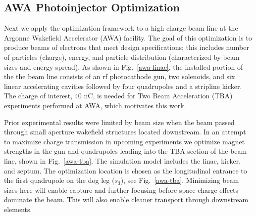 \subsection{AWA Photoinjector Optimization} \label{awaproblem}
Next we apply the optimization framework to a high charge beam line
 at the Argonne Wakefield Accelerator (AWA) facility. 
The goal of this optimization is to produce beams of electrons that meet 
design specifications; this includes number of particles (charge), energy, and particle distribution (characterized by beam sizes and energy spread).
As shown in Fig.~\ref{awa-linac}, the installed portion of the the 
beam line consists of an rf photocathode gun, 
two solenoids, and six linear accelerating cavities
followed by four quadrupoles and a stripline kicker. 
The charge of interest, 40 nC, is needed for Two Beam 
Acceleration (TBA) \cite{gai_power_jing_2012,JING201872} 
experiments performed at AWA, which motivates this work. 

Prior experimental results were limited by beam size when the beam passed through small aperture 
wakefield structures located downstream. 
In an attempt to maximize charge transmission in upcoming experiments
we optimize magnet strengths in the gun and quadrupoles leading into the 
TBA section of the beam line, shown in Fig.~\ref{awa-tba}.
The simulation model includes the linac, kicker, and septum. 
The optimization location is chosen as the longitudinal 
entrance to the first quadrupole on the dog leg ($s_3$), see Fig.~\ref{awa-tba}.
Minimizing beam sizes here will enable capture and further focusing before space charge effects dominate the beam. 
This will also enable cleaner transport through downstream elements.

